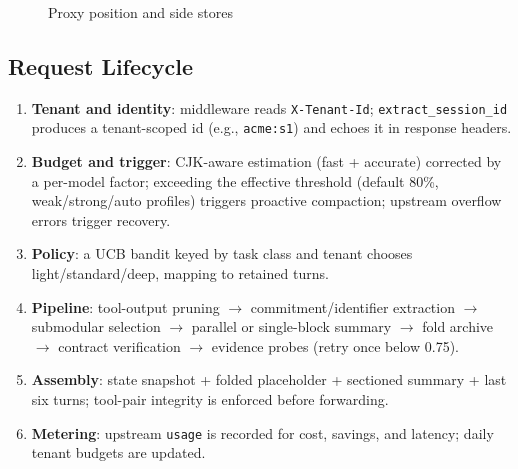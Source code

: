 \documentclass[11pt,a4paper]{article}
\begin{document}
\begin{figure}[htbp]
\centering
{}
\caption{Proxy position and side stores}
\end{figure}

\subsection{Request Lifecycle}
\begin{enumerate}
  \item \textbf{Tenant and identity}: middleware reads \texttt{X-Tenant-Id}; \texttt{extract\_session\_id} produces a tenant-scoped id (e.g., \texttt{acme:s1}) and echoes it in response headers.
  \item \textbf{Budget and trigger}: CJK-aware estimation (fast + accurate) corrected by a per-model factor; exceeding the effective threshold (default 80\%, weak/strong/auto profiles) triggers proactive compaction; upstream overflow errors trigger recovery.
  \item \textbf{Policy}: a UCB bandit keyed by task class and tenant chooses light/standard/deep, mapping to retained turns.
  \item \textbf{Pipeline}: tool-output pruning $\rightarrow$ commitment/identifier extraction $\rightarrow$ submodular selection $\rightarrow$ parallel or single-block summary $\rightarrow$ fold archive $\rightarrow$ contract verification $\rightarrow$ evidence probes (retry once below 0.75).
  \item \textbf{Assembly}: state snapshot + folded placeholder + sectioned summary + last six turns; tool-pair integrity is enforced before forwarding.
  \item \textbf{Metering}: upstream \texttt{usage} is recorded for cost, savings, and latency; daily tenant budgets are updated.
\end{enumerate}
\end{document}
